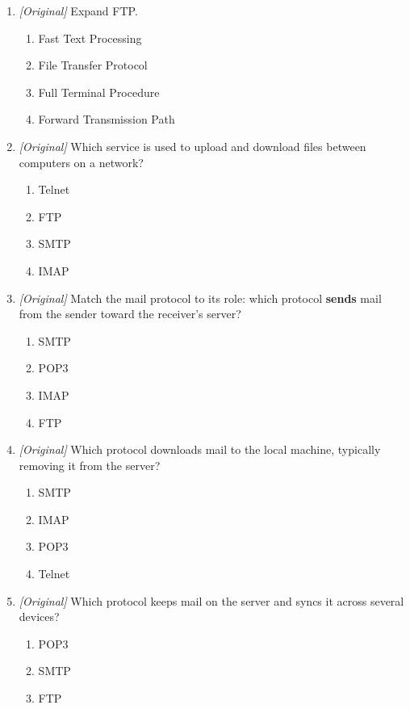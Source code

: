 \documentclass[11pt]{article}
\begin{document}
\begin{enumerate}[label=\textbf{Q\arabic*.}, leftmargin=*]
\begin{enumerate}[label=\Alph*.]
    \item Telnet
    \item DNS
  \end{enumerate}
\item \textit{[Original]} Expand FTP.
  \begin{enumerate}[label=\Alph*.]
    \item Fast Text Processing
    \item File Transfer Protocol
    \item Full Terminal Procedure
    \item Forward Transmission Path
  \end{enumerate}
\item \textit{[Original]} Which service is used to upload and download files
  between computers on a network?
  \begin{enumerate}[label=\Alph*.]
    \item Telnet
    \item FTP
    \item SMTP
    \item IMAP
  \end{enumerate}
\item \textit{[Original]} Match the mail protocol to its role: which protocol
  \textbf{sends} mail from the sender toward the receiver's server?
  \begin{enumerate}[label=\Alph*.]
    \item SMTP
    \item POP3
    \item IMAP
    \item FTP
  \end{enumerate}
\item \textit{[Original]} Which protocol downloads mail to the local machine,
  typically removing it from the server?
  \begin{enumerate}[label=\Alph*.]
    \item SMTP
    \item IMAP
    \item POP3
    \item Telnet
  \end{enumerate}
\item \textit{[Original]} Which protocol keeps mail on the server and syncs
  it across several devices?
  \begin{enumerate}[label=\Alph*.]
    \item POP3
    \item SMTP
    \item FTP

\end{enumerate}
\end{enumerate}
\end{document}
